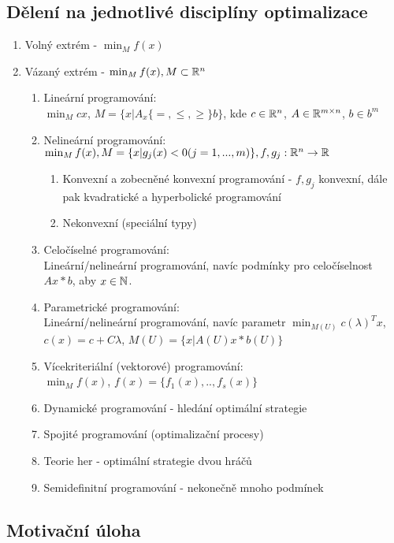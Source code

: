 \documentclass[a4paper,12pt,titlepage]{article}
\begin{document}
\subsection{Dělení na jednotlivé disciplíny optimalizace}
\setcounter{equation}{0}
\begin{enumerate}
	\item Volný extrém - $\min_M f(x)$
	\item Vázaný extrém - $\min_M f(x), M \subset \mathbb{R}^n$
	\begin{enumerate}
		\item Lineární programování: \\
			$\min_M cx$, $M = \{ x | A_x
			\{=,\le,\ge\}
			b\}$, kde $c \in \mathbb{R}^n$, $A \in \mathbb{R}^{m \times n}$, $b \in b^m$
		\item Nelineární programování: \\
			$\min_M f(x), M = \{ x | g_j(x) < 0 (j = 1, ..., m) \}, f, g_j:
			\mathbb{R}^n \to \mathbb{R}$
			\begin{enumerate}
				\item Konvexní a zobecněné konvexní programování - $f,g_j$
				konvexní, dále pak kvadratické a hyperbolické programování
				\item Nekonvexní (speciální typy)
			\end{enumerate}
		\item Celočíselné programování: \\
			Lineární/nelineární programování, navíc podmínky pro celočíselnost
			$Ax * b$, aby $x \in \mathbb{N}$.
		\item Parametrické programování: \\
			Lineární/nelineární programování, navíc parametr $\min_{M(U)} c
			(\lambda)^T x$, $c(x) = c + C\lambda$, $M(U) = \{ x | A(U) x * b(U)
			\}$
		\item Vícekriteriální (vektorové) programování: \\
			$\min_M f(x)$, $f(x) = \{f_1(x), .., f_s(x)\}$
		\item Dynamické programování - hledání optimální strategie
		\item Spojité programování (optimalizační procesy)
		\item Teorie her - optimální strategie dvou hráčů
		\item Semidefinitní programování - nekonečně mnoho podmínek
	\end{enumerate}
\end{enumerate}

\subsection{Motivační úloha}
\setcounter{equation}{0}
\end{document}
